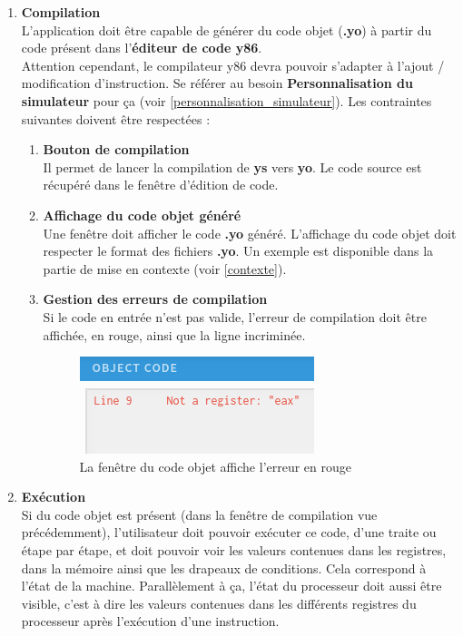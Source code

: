 \documentclass[french]{article}
\newcommand{\itembf}[1]{\item \textbf{#1}\\}
\begin{document}
\begin{enumerate}
    
    \itembf{Compilation}
    L'application doit être capable de générer du code objet (\textbf{.yo}) à partir du code présent dans l'\textbf{éditeur de code y86}.\\
    Attention cependant, le compilateur y86 devra pouvoir s'adapter à l'ajout / modification d'instruction. Se référer au besoin \textbf{Personnalisation du simulateur} pour ça (voir \ref{personnalisation_simulateur}). 
    Les contraintes suivantes doivent être respectées :
    \begin{enumerate}
        \itembf{Bouton de compilation}
        Il permet de lancer la compilation de \textbf{ys} vers \textbf{yo}. Le code source est récupéré dans le fenêtre d'édition de code.
        \itembf{Affichage du code objet généré}
        Une fenêtre doit afficher le code \textbf{.yo} généré. L'affichage du code objet doit respecter le format des fichiers \textbf{.yo}. Un exemple est disponible dans la partie de mise en contexte (voir \ref{contexte}).
        \itembf{Gestion des erreurs de compilation}
        Si le code en entrée n'est pas valide, l'erreur de compilation doit être affichée, en rouge, ainsi que la ligne incriminée.
        \begin{figure}[H]
            \centering
            \includegraphics[]{img/ex_erreur_compilation.png}
            \caption{La fenêtre du code objet affiche l'erreur en rouge}
            \label{fig:ex_erreur_compilation}
        \end{figure}
    \end{enumerate}{}
    
    
    \itembf{Exécution}
    Si du code objet est présent (dans la fenêtre de compilation vue précédemment), l'utilisateur doit pouvoir exécuter ce code, d'une traite ou étape par étape, et doit pouvoir voir les valeurs contenues dans les registres, dans la mémoire ainsi que les drapeaux de conditions. Cela correspond à l'état de la machine. Parallèlement à ça, l'état du processeur doit aussi être visible, c'est à dire les valeurs contenues dans les différents registres du processeur après l'exécution d'une instruction.\\ 


\end{enumerate}
\end{document}
